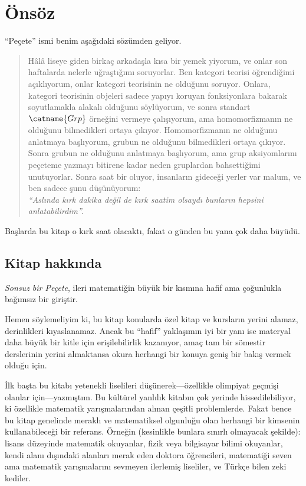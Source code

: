 \chapter{Önsöz}
``Peçete'' ismi benim aşağıdaki sözümden geliyor.
\begin{quote}
\small
Hâlâ liseye giden birkaç arkadaşla kısa bir yemek yiyorum, ve 
onlar son haftalarda nelerle uğraştığımı soruyorlar. Ben kategori teorisi
öğrendiğimi açıklıyorum, onlar kategori teorisinin ne olduğunu soruyor.
Onlara, kategori teorisinin objeleri sadece yapıyı koruyan fonksiyonlara bakarak 
soyutlamakla alakalı olduğunu söylüyorum, ve sonra standart $\catname{Grp}$ 
örneğini vermeye çalışıyorum, ama homomorfizmanın ne olduğunu bilmedikleri 
ortaya çıkıyor. Homomorfizmanın ne olduğunu anlatmaya başlıyorum, 
grubun ne olduğunu bilmedikleri ortaya çıkıyor. Sonra grubun ne olduğunu anlatmaya 
başlıyorum, ama grup aksiyomlarını peçeteme yazmayı bitirene kadar neden gruplardan 
bahsettiğimi unutuyorlar. Sonra saat bir oluyor, insanların gideceği yerler var malum, ve 
ben sadece şunu düşünüyorum:\\[0.5ex]
\emph{``Aslında kırk dakika değil de kırk saatim olsaydı bunların 
hepsini anlatabilirdim''.}
\end{quote}
Başlarda bu kitap o kırk saat olacaktı, fakat o günden bu yana
çok daha büyüdü.

\section*{Kitap hakkında}
\emph{Sonsuz bir Peçete}, ileri matematiğin büyük bir kısmına 
hafif ama çoğunlukla bağımsız bir giriştir.

Hemen söylemeliyim ki, bu kitap konularda özel
kitap ve kursların yerini alamaz, derinlikleri kıyaslanamaz.
Ancak bu ``hafif'' yaklaşımın iyi bir yanı ise materyal daha büyük 
bir kitle için erişilebilirlik kazanıyor, amaç tam bir sömestir 
derslerinin yerini almaktansa okura herhangi bir konuya 
geniş bir bakış vermek olduğu için.

İlk başta bu kitabı yetenekli liselileri düşünerek---özellikle 
olimpiyat geçmişi olanlar için---yazmıştım. Bu kültürel yanlılık 
kitabın çok yerinde hissedilebiliyor, ki özellikle matematik 
yarışmalarından alınan çeşitli problemlerde. 
Fakat bence bu kitap genelinde meraklı ve matematiksel olgunluğu olan 
herhangi bir kimsenin kullanabileceği bir referans.
Örneğin (kesinlikle bunlara sınırlı olmayacak şekilde): 
lisans düzeyinde matematik okuyanlar, fizik veya bilgisayar bilimi 
okuyanlar, kendi alanı dışındaki alanları merak eden doktora öğrencileri, 
matematiği seven ama matematik yarışmalarını sevmeyen ilerlemiş liseliler, 
ve Türkçe bilen zeki kediler. 

